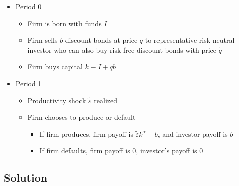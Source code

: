 \documentclass{article}
\begin{document}
\begin{itemize}
\item Period 0
\begin{itemize}
\item Firm is born with funds $I$
\item Firm sells $b$ discount bonds at price $q$ to representative risk-neutral investor who can also buy risk-free discount bonds with price $\tilde q$
\item Firm buys capital $k \equiv I + q b$ 
\end{itemize}
\item Period 1
\begin{itemize}
\item Productivity shock $\tilde \varepsilon$ realized
\item Firm chooses to produce or default
\begin{itemize}
\item If firm produces, firm payoff is $\tilde \varepsilon k^\alpha - b$, and investor payoff is $b$
\item If firm defaults, firm payoff is 0, investor's payoff is 0
\end{itemize}
\end{itemize}
\end{itemize}

\subsection*{Solution}
\end{document}
